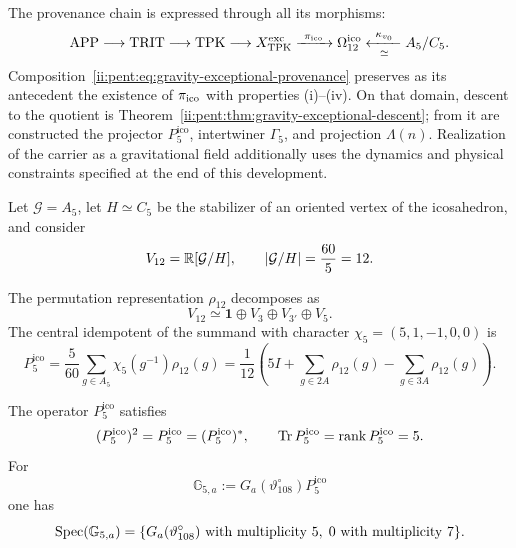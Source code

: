 The provenance chain is expressed through all its morphisms:
\begin{equation}
\label{ii:pent:eq:gravity-exceptional-provenance}
\mathrm{APP}\longrightarrow\mathrm{TRIT}\longrightarrow\mathrm{TPK}
\longrightarrow X_{\rm TPK}^{\rm exc}
\xrightarrow{\ \pi_{\rm ico}\ }\Omega_{12}^{\rm ico}
\xleftarrow[\simeq]{\ \kappa_{v_0}\ }A_5/C_5.
\end{equation}
Composition~\eqref{ii:pent:eq:gravity-exceptional-provenance} preserves
as its antecedent the existence of \(\pi_{\rm ico}\) with properties
(i)--(iv). On that domain, descent to the quotient is
Theorem~\ref{ii:pent:thm:gravity-exceptional-descent}; from it are constructed
the projector \(P^{\mathrm{ico}}_5\), intertwiner \(\Gamma_5\), and
projection \(\Lambda(n)\). Realization of the carrier as a gravitational
field additionally uses the dynamics and physical constraints
specified at the end of this development.

Let \(\mathcal G=A_5\), let \(H\simeq C_5\) be the stabilizer of an oriented
vertex of the icosahedron, and consider
\begin{equation}
\label{ii:pent:eq:gravity-v12}
V_{12}=\mathbb R[\mathcal G/H],
\qquad |\mathcal G/H|=\frac{60}{5}=12.
\end{equation}


The permutation representation \(\rho_{12}\) decomposes as
\begin{equation}
\label{ii:pent:eq:gravity-v12-decomposition}
V_{12}\simeq\mathbf1\oplus V_3\oplus V_{3'}\oplus V_5.
\end{equation}
The central idempotent of the summand with character
\(\chi_5=(5,1,-1,0,0)\) is
\begin{equation}
\label{ii:pent:eq:gravity-p5}
\boxed{
P^{\mathrm{ico}}_5=\frac5{60}\sum_{g\in A_5}\chi_5(g^{-1})\rho_{12}(g)
=\frac1{12}\left(
5I+\sum_{g\in2A}\rho_{12}(g)
-\sum_{g\in3A}\rho_{12}(g)
\right).}
\end{equation}

\begin{theorem}
\label{ii:pent:thm:gravity-p5-coupling}
The operator \(P^{\mathrm{ico}}_5\) satisfies
\begin{equation}
\label{ii:pent:eq:gravity-p5-properties}
(P^{\mathrm{ico}}_5)^2=P^{\mathrm{ico}}_5=(P^{\mathrm{ico}}_5)^*,
\qquad \operatorname{Tr} P^{\mathrm{ico}}_5=\operatorname{rank} P^{\mathrm{ico}}_5=5.
\end{equation}
For
\begin{equation}
\label{ii:pent:eq:gravity-G5}
\mathbb G_{5,a}:=G_a(\vartheta^\circ_{108})P^{\mathrm{ico}}_5
\end{equation}
one has
\begin{equation}
\label{ii:pent:eq:gravity-G5-spectrum}
\operatorname{Spec}(\mathbb G_{5,a})
=\{G_a(\vartheta^\circ_{108})\text{ with multiplicity }5,
\;0\text{ with multiplicity }7\}.
\end{equation}
\end{theorem}

